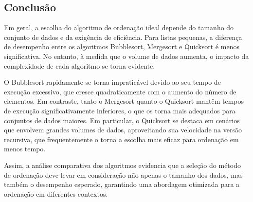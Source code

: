 \subsection{Conclusão}

\hspace{0.6cm}Em geral, a escolha do algoritmo de ordenação ideal depende do tamanho do conjunto de dados e da exigência de eficiência. Para listas pequenas, a diferença de desempenho entre os algoritmos Bubblesort, Mergesort e Quicksort é menos significativa. No entanto, à medida que o volume de dados aumenta, o impacto da complexidade de cada algoritmo se torna evidente. 

O Bubblesort rapidamente se torna impraticável devido ao seu tempo de execução excessivo, que cresce quadraticamente com o aumento do número de elementos. Em contraste, tanto o Mergesort quanto o Quicksort mantêm tempos de execução significativamente inferiores, o que os torna mais adequados para conjuntos de dados maiores. Em particular, o Quicksort se destaca em cenários que envolvem grandes volumes de dados, aproveitando sua velocidade na versão recursiva, que frequentemente o torna a escolha mais eficaz para ordenação em menos tempo. 

Assim, a análise comparativa dos algoritmos evidencia que a seleção do método de ordenação deve levar em consideração não apenas o tamanho dos dados, mas também o desempenho esperado, garantindo uma abordagem otimizada para a ordenação em diferentes contextos.
